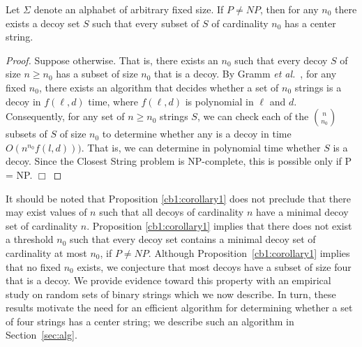 \begin{proposition} \label{cb1:corollary1} Let $\Sigma$ denote an alphabet of arbitrary fixed size. If $P \neq NP$, then for any $n_0$ there exists a decoy set $S$ such that every subset of $S$ of cardinality $n_0$ has a center string. \end{proposition}

\begin{proof} Suppose otherwise. That is, there exists an $n_0$ such that
every decoy $S$ of size $n \geq n_0$
has a subset of size $n_0$ that is a decoy.
By Gramm {\em et al.}\ \cite{GNR03}, for any fixed $n_0$, 
there exists an algorithm that decides whether a set of $n_0$ strings 
is a decoy in $f(\ell,d)$ time, where $f(\ell,d)$ is polynomial in $\ell$ and $d$.
Consequently, for any set of $n \geq n_0$ strings $S$, 
we can check each of the ${{n} \choose {n_0}}$ subsets of $S$ of size $n_0$
to determine whether any is a decoy in time $O(n^{n_0} f(l,d)))$.
That is, we can determine in polynomial time whether $S$ is a decoy.
Since the {\sc Closest String} problem is NP-complete, 
this is possible only if P = NP.
\hfill $\Box$ \end{proof}

It should be noted that Proposition \ref{cb1:corollary1} does not preclude that there may exist values of $n$ such that all decoys of cardinality $n$ have a minimal decoy set of cardinality $n$.  Proposition \ref{cb1:corollary1}  implies that there does not exist a threshold $n_0$ such that every decoy set contains a minimal decoy set of cardinality at most $n_0$, if $P \not= NP$.  Although Proposition~\ref{cb1:corollary1} implies that no fixed $n_0$ exists, we conjecture that most decoys have a subset of size four that is a decoy. We provide evidence toward this property with an empirical study on random sets of binary strings which we now describe. In turn, these results motivate the need for an efficient algorithm for determining whether a set of four strings has a center string; we describe such an algorithm in Section~\ref{sec:alg}.

